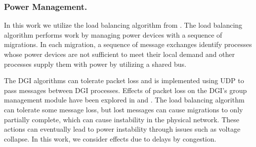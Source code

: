 
\subsubsection{Power Management.}

In this work we utilize the load balancing algorithm from \cite{LOADBALANCING}.
The load balancing algorithm performs work by managing power devices with a sequence of migrations\cite{HILTESTBED}.
In each migration, a sequence of message exchanges identify processes whose power devices are not sufficient to meet their local demand and other processes supply them with power by utilizing a shared bus.

The \ac{DGI} algorithms can tolerate packet loss and is implemented using UDP to pass messages between \ac{DGI} processes.
Effects of packet loss on the \ac{DGI}'s group management module have been explored in \cite{CRITIS2012} and \cite{JOURNAL}.
The load balancing algorithm can tolerate some message loss, but lost messages can cause migrations to only partially complete, which can cause instability in the physical network.
These actions can eventually lead to power instability through issues such as voltage collapse.
In this work, we consider effects due to delays by congestion.

